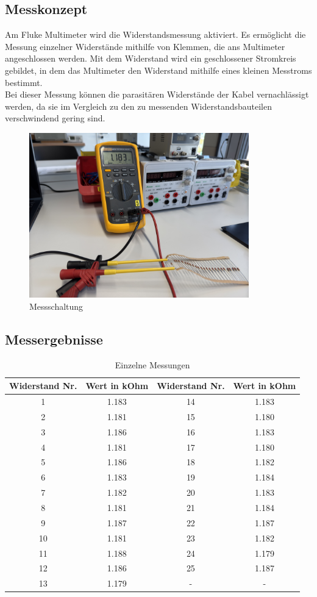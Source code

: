 \documentclass[a4paper,12pt]{article}
\begin{document}
\subsection{Messkonzept}
Am Fluke Multimeter wird die Widerstandsmessung aktiviert. Es ermöglicht die Messung einzelner Widerstände mithilfe von Klemmen, die ans Multimeter angeschlossen werden. Mit dem Widerstand wird ein geschlossener Stromkreis gebildet, in dem das Multimeter den Widerstand mithilfe eines kleinen Messtroms bestimmt.\\
\noindent Bei dieser Messung können die parasitären Widerstände der Kabel vernachlässigt werden, da sie im Vergleich zu den zu messenden Widerstandsbauteilen verschwindend gering sind.

\begin{figure}[H]
    \centering
    \includegraphics[width=0.85\textwidth]{../Quellen/Labor2/Fotos/IMG_4011.jpeg}
\caption{Messschaltung}
\end{figure}

\subsection{Messergebnisse}
\begin{table}[H]
	\centering
	\begin{tabular}{|c|c|c|c|}
		\hline
		Widerstand Nr. & Wert in kOhm & Widerstand Nr. & Wert in kOhm \\
		\hline
		1 & 1.183 & 14 & 1.183 \\
		2 & 1.181 & 15 & 1.180 \\
		3 & 1.186 & 16 & 1.183 \\
		4 & 1.181 & 17 & 1.180 \\
		5 & 1.186 & 18 & 1.182 \\
		6 & 1.183 & 19 & 1.184 \\
		7 & 1.182 & 20 & 1.183 \\
		8 & 1.181 & 21 & 1.184 \\
		9 & 1.187 & 22 & 1.187 \\
		10 & 1.181 & 23 & 1.182 \\
		11 & 1.188 & 24 & 1.179 \\
		12 & 1.186 & 25 & 1.187 \\
		13 & 1.179 & - & - \\
		\hline
	\end{tabular}
	\caption{Einzelne Messungen}
\end{table}
\end{document}
